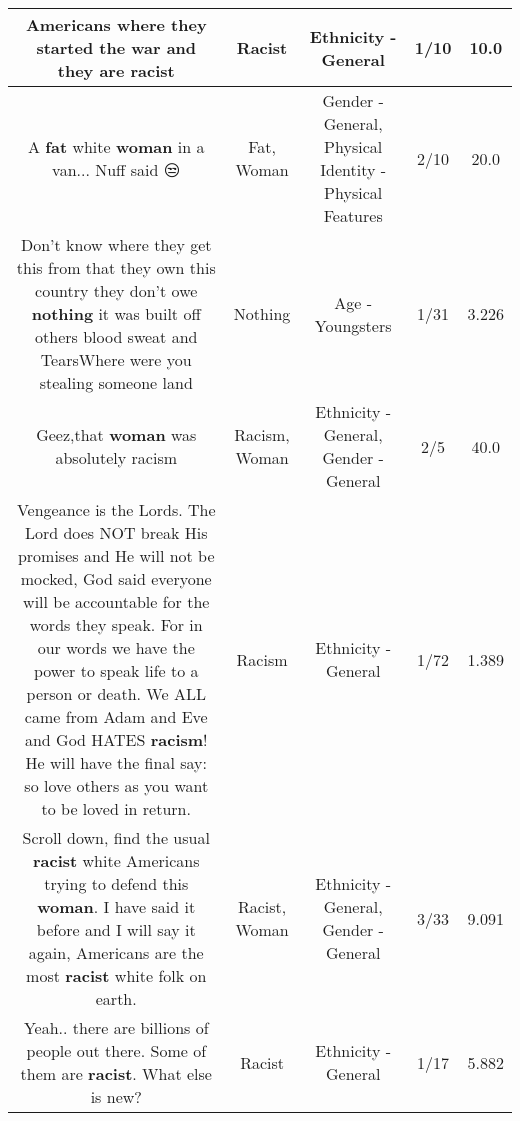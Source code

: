 \documentclass[11pt]{article}
\newlength\mylength
\begin{document}
\begin{center}
\begin{longtable}{|C{.65\mylength}|C{.30\mylength}|C{.12\mylength}|C{.12\mylength}|C{.12\mylength}|}
  \small Americans where they started the war and they are racist\normalsize   & Racist & Ethnicity - General & 1/10 & 10.0 \\  \hline
  \small A \textbf{fat} white \textbf{woman} in a van... Nuff said 😒\normalsize   & Fat, Woman & Gender - General, Physical Identity - Physical Features & 2/10 & 20.0 \\  \hline
  \small Don't know where they get this from that they  own  this country they don't owe \textbf{nothing} it was built  off  others blood sweat  and TearsWhere  were you stealing someone land\normalsize   & Nothing & Age - Youngsters & 1/31 & 3.226 \\  \hline
  \small Geez,that \textbf{woman} was absolutely racism\normalsize   & Racism, Woman & Ethnicity - General, Gender - General & 2/5 & 40.0 \\  \hline
  \small Vengeance is the Lords. The Lord does NOT break His promises and He will not be mocked, God said everyone will be accountable for the words they speak. For in our words we have the power to speak life to a person or death. We ALL came from Adam and Eve and God HATES \textbf{racism}! He will have the final say: so love others as you want to be loved in return.\normalsize   & Racism & Ethnicity - General & 1/72 & 1.389 \\  \hline
  \small Scroll down, find the usual \textbf{racist} white Americans trying to defend this \textbf{woman}. I have said it before and I will say it again, Americans are the most \textbf{racist} white folk on earth.\normalsize   & Racist, Woman & Ethnicity - General, Gender - General & 3/33 & 9.091 \\  \hline
  \small Yeah.. there are billions of people out there. Some of them are \textbf{racist}. What else is new?\normalsize   & Racist & Ethnicity - General & 1/17 & 5.882 \\  \hline

\end{longtable}
\end{center}
\end{document}
